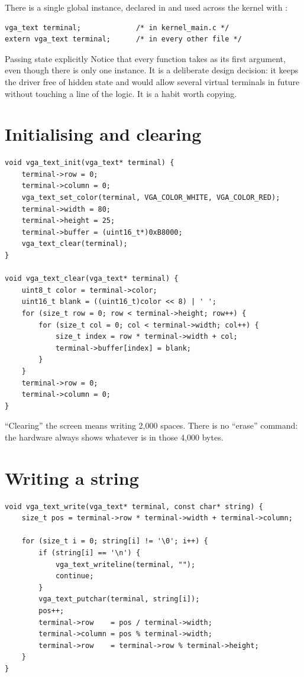 There is a single global instance, declared in  and used across the kernel with
:

\begin{lstlisting}[style=c]
vga_text terminal;             /* in kernel_main.c */
extern vga_text terminal;      /* in every other file */
\end{lstlisting}

\begin{concept}{Passing state explicitly}
Notice that every function takes  as its first argument, even though there
is only one instance. It is a deliberate design decision: it keeps the driver free of hidden state
and would allow several virtual terminals in future without touching a line of the logic. It is a
habit worth copying.
\end{concept}

\section{Initialising and clearing}

\begin{lstlisting}[style=c]
void vga_text_init(vga_text* terminal) {
    terminal->row = 0;
    terminal->column = 0;
    vga_text_set_color(terminal, VGA_COLOR_WHITE, VGA_COLOR_RED);
    terminal->width = 80;
    terminal->height = 25;
    terminal->buffer = (uint16_t*)0xB8000;
    vga_text_clear(terminal);
}

void vga_text_clear(vga_text* terminal) {
    uint8_t color = terminal->color;
    uint16_t blank = ((uint16_t)color << 8) | ' ';
    for (size_t row = 0; row < terminal->height; row++) {
        for (size_t col = 0; col < terminal->width; col++) {
            size_t index = row * terminal->width + col;
            terminal->buffer[index] = blank;
        }
    }
    terminal->row = 0;
    terminal->column = 0;
}
\end{lstlisting}

``Clearing'' the screen means writing 2,000 spaces. There is no ``erase'' command: the hardware
always shows whatever is in those 4,000 bytes.

\section{Writing a string}

\begin{lstlisting}[style=c]
void vga_text_write(vga_text* terminal, const char* string) {
    size_t pos = terminal->row * terminal->width + terminal->column;

    for (size_t i = 0; string[i] != '\0'; i++) {
        if (string[i] == '\n') {
            vga_text_writeline(terminal, "");
            continue;
        }
        vga_text_putchar(terminal, string[i]);
        pos++;
        terminal->row    = pos / terminal->width;
        terminal->column = pos % terminal->width;
        terminal->row    = terminal->row % terminal->height;
    }
}
\end{lstlisting}

